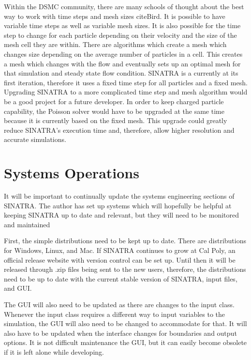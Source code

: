 \indent Within the DSMC community, there are many schools of thought about the best way to work with time steps and mesh sizes citeBird. It is possible to have variable time steps as well as variable mesh sizes. It is also possible for the time step to change for each particle depending on their velocity and the size of the mesh cell they are within. There are algorithms which create a mesh which changes size depending on the average number of particles in a cell. This creates a mesh which changes with the flow and eventually sets up an optimal mesh for that simulation and steady state flow condition. SINATRA is a currently at its first iteration, therefore it uses a fixed time step for all particles and a fixed mesh. Upgrading SINATRA to a more complicated time step and mesh algorithm would be a good project for a future developer. In order to keep charged particle capability, the Poisson solver would have to be upgraded at the same time because it is currently based on the fixed mesh. This upgrade could greatly reduce SINATRA’s execution time and, therefore, allow higher resolution and accurate simulations. \par

\section{Systems Operations}

It will be important to continually update the systems engineering sections of SINATRA. The author has set up systems which will hopefully be helpful at keeping SINATRA up to date and relevant, but they will need to be monitored and maintained
 \par

\indent First, the simple distributions need to be kept up to date. There are distributions for Windows, Linux, and Mac. If SINATRA continues to grow at Cal Poly, an official release website with version control can be set up. Until then it will be released through .zip files being sent to the new users, therefore, the distributions need to be up to date with the current stable version of SINATRA, input files, and GUI. \par

\indent The GUI will also need to be updated as there are changes to the input class. Whenever the input class requires a different way to input variables to the simulation, the GUI will also need to be changed to accommodate for that. It will also have to be updated when the interface changes for boundaries and output options. It is not difficult maintenance the GUI, but it can easily become obsolete if it is left alone while developing. \par

